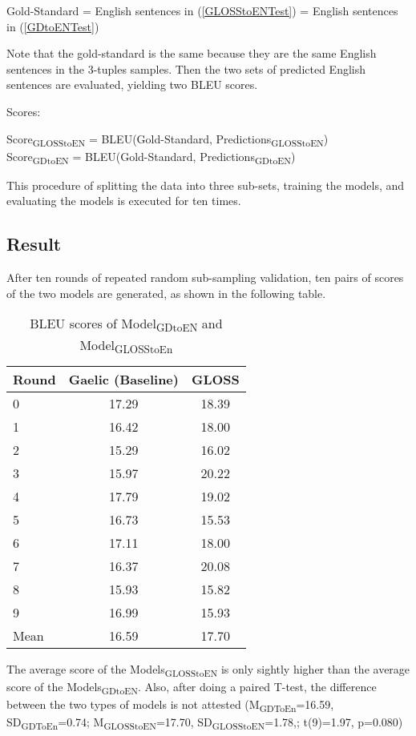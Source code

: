 \documentclass[a4paper]{article}
\begin{document}
\begin{exe}
\ex Gold-Standard = English sentences in (\ref{GLOSStoENTest}) = English sentences in (\ref{GDtoENTest})
\end{exe}
Note that the gold-standard is the same because they are the same English sentences in the 3-tuples samples. Then the two sets of predicted English sentences are evaluated, yielding two BLEU scores.   

\begin{exe}
\ex Scores: \\
  \begin{xlist}
	\ex Score\textsubscript{GLOSStoEN} = BLEU(Gold-Standard, Predictions\textsubscript{GLOSStoEN}) \\
	\ex Score\textsubscript{GDtoEN} = BLEU(Gold-Standard, Predictions\textsubscript{GDtoEN}) \\
  \end{xlist}
\end{exe}
This procedure of splitting the data into three sub-sets, training the models, and evaluating the models is executed for ten times. 

\subsection{Result} \label{gdglen_results}
After ten rounds of repeated random sub-sampling validation, ten pairs of scores of the two models are generated, as shown in the following table. 
\begin{table}[ht]
\centering
\begin{tabular}{lcc}
  \hline
Round & Gaelic (Baseline) & GLOSS \\ 
  \hline
0 & 17.29 & 18.39 \\ 
  1 & 16.42 & 18.00 \\ 
  2 & 15.29 & 16.02 \\ 
  3 & 15.97 & 20.22 \\ 
  4 & 17.79 & 19.02 \\ 
  5 & 16.73 & 15.53 \\ 
  6 & 17.11 & 18.00 \\ 
  7 & 16.37 & 20.08 \\ 
  8 & 15.93 & 15.82 \\ 
  9 & 16.99 & 15.93 \\ 
   \hline
Mean & 16.59 & 17.70 \\ 
   \hline
\end{tabular}
\caption{BLEU scores of Model\textsubscript{GDtoEN} and Model\textsubscript{GLOSStoEn}} 
\label{Table:GLOSS}
\end{table}
The average score of the Models\textsubscript{GLOSStoEN} is only sightly higher than the average score of the Models\textsubscript{GDtoEN}. 
Also, after doing a paired T-test, the difference between the two types of models is not attested 
(M\textsubscript{GDToEn}=16.59, SD\textsubscript{GDToEn}=0.74; M\textsubscript{GLOSStoEN}=17.70, SD\textsubscript{GLOSStoEN}=1.78,; t(9)=1.97, p=0.080)
\end{document}
